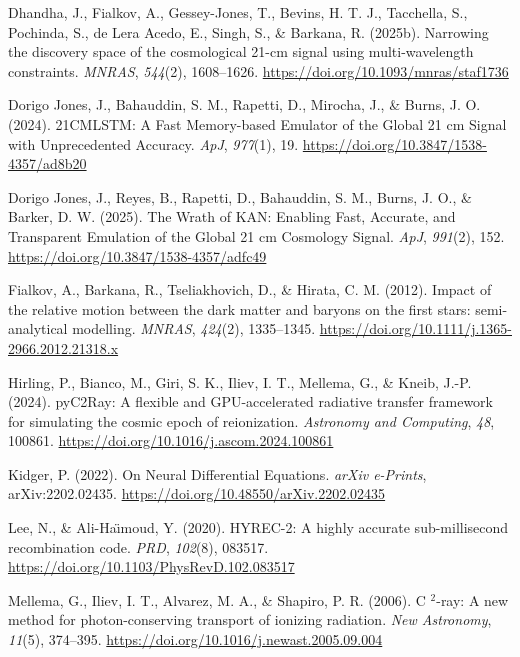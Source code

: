 \documentclass[
]{article}
\newlength{\cslhangindent}
\newenvironment{CSLReferences}[2] %
 {\begin{list}{}{%
  \setlength{\itemindent}{0pt}
  \setlength{\leftmargin}{0pt}
  \setlength{\parsep}{0pt}
  \ifodd #1
   \setlength{\leftmargin}{\cslhangindent}
   \setlength{\itemindent}{-1\cslhangindent}
  \fi
  \setlength{\itemsep}{#2\baselineskip}}}
 {\end{list}}
\begin{document}
\begin{CSLReferences}{1}{0}
Dhandha, J., Fialkov, A., Gessey-Jones, T., Bevins, H. T. J., Tacchella,
S., Pochinda, S., de Lera Acedo, E., Singh, S., \& Barkana, R. (2025b).
{Narrowing the discovery space of the cosmological 21-cm signal using
multi-wavelength constraints}. \emph{MNRAS}, \emph{544}(2), 1608--1626.
\url{https://doi.org/10.1093/mnras/staf1736}

Dorigo Jones, J., Bahauddin, S. M., Rapetti, D., Mirocha, J., \& Burns,
J. O. (2024). {21CMLSTM: A Fast Memory-based Emulator of the Global 21
cm Signal with Unprecedented Accuracy}. \emph{ApJ}, \emph{977}(1), 19.
\url{https://doi.org/10.3847/1538-4357/ad8b20}

Dorigo Jones, J., Reyes, B., Rapetti, D., Bahauddin, S. M., Burns, J.
O., \& Barker, D. W. (2025). {The Wrath of KAN: Enabling Fast, Accurate,
and Transparent Emulation of the Global 21 cm Cosmology Signal}.
\emph{ApJ}, \emph{991}(2), 152.
\url{https://doi.org/10.3847/1538-4357/adfc49}

Fialkov, A., Barkana, R., Tseliakhovich, D., \& Hirata, C. M. (2012).
{Impact of the relative motion between the dark matter and baryons on
the first stars: semi-analytical modelling}. \emph{MNRAS},
\emph{424}(2), 1335--1345.
\url{https://doi.org/10.1111/j.1365-2966.2012.21318.x}

Hirling, P., Bianco, M., Giri, S. K., Iliev, I. T., Mellema, G., \&
Kneib, J.-P. (2024). {pyC2Ray: A flexible and GPU-accelerated radiative
transfer framework for simulating the cosmic epoch of reionization}.
\emph{Astronomy and Computing}, \emph{48}, 100861.
\url{https://doi.org/10.1016/j.ascom.2024.100861}

Kidger, P. (2022). {On Neural Differential Equations}. \emph{arXiv
e-Prints}, arXiv:2202.02435.
\url{https://doi.org/10.48550/arXiv.2202.02435}

Lee, N., \& Ali-Ha\"{\i}moud, Y. (2020). {HYREC-2: A highly accurate
sub-millisecond recombination code}. \emph{PRD}, \emph{102}(8), 083517.
\url{https://doi.org/10.1103/PhysRevD.102.083517}

Mellema, G., Iliev, I. T., Alvarez, M. A., \& Shapiro, P. R. (2006). {C
\(^{2}\)-ray: A new method for photon-conserving transport of ionizing
radiation}. \emph{New Astronomy}, \emph{11}(5), 374--395.
\url{https://doi.org/10.1016/j.newast.2005.09.004}


\end{CSLReferences}
\end{document}
